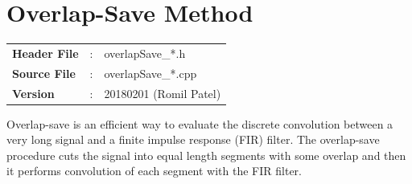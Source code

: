 %
%
\clearpage
\section{Overlap-Save Method}
\begin{tcolorbox}	
	\begin{tabular}{p{2.75cm} p{0.2cm} p{10.5cm}} 	
		\textbf{Header File}   &:& overlapSave\_*.h \\
		\textbf{Source File}   &:& overlapSave\_*.cpp \\
		\textbf{Version}       &:& 20180201 (Romil Patel)
	\end{tabular}
\end{tcolorbox}
Overlap-save is an efficient way to evaluate the discrete convolution between a very long signal and a finite impulse response (FIR) filter. The overlap-save procedure cuts the signal into equal length segments with some overlap and then it performs convolution of each segment with the FIR filter.
